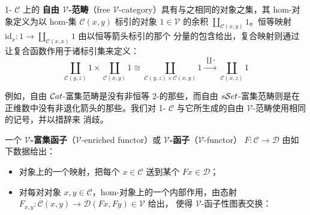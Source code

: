 \begin{definition}\label{def:free-v-category}
1-\trCategory{} $\mathcal{C}$ 上的 \textbf{自由 $\mathcal{V}$-范畴}（free
$\mathcal{V}$-category）具有与之相同的对象之集，其 hom-对象定义为以 hom-集
$\mathcal{C}(x,y)$ 标引的\trTerminal{}对象 $1\in\mathcal{V}$ 的余积
$\coprod_{\mathcal{C}(x,y)}1$。恒等映射
$\mathrm{id}_{x}\colon 1\to\coprod_{\mathcal{C}(x,x)}1$ 由以恒等箭头标引的那个
分量的包含给出，复合映射则通过让复合函数作用于诸标引集来定义：
\[ \coprod_{\mathcal{C}(y,z)}1\times\coprod_{\mathcal{C}(x,y)}1
   \cong\coprod_{\mathcal{C}(y,z)\times\mathcal{C}(x,y)}1
   \xrightarrow{\ \coprod\circ\ }\coprod_{\mathcal{C}(x,z)}1 \]
\end{definition}

例如，自由 $\mathcal{C}at$-富集范畴是没有非恒等 2-\trCell{}的那些，而自由
$s\mathcal{S}et$-富集范畴则是在正维数中没有非退化箭头的那些。我们对 1-\trCategory{}
$\mathcal{C}$ 与它所生成的自由 $\mathcal{V}$-范畴使用相同的记号，并以措辞来
消歧。

\begin{definition}\label{def:v-enriched-functor}
一个 \textbf{$\mathcal{V}$-富集函子}（$\mathcal{V}$-enriched functor）或
\textbf{$\mathcal{V}$-函子}（$\mathcal{V}$-functor）
$F\colon\mathcal{C}\to\mathcal{D}$ 由如下数据给出：
\begin{itemize}
\item 对象上的一个映射，把每个 $x\in\mathcal{C}$ 送到某个 $Fx\in\mathcal{D}$；
\item 对每对对象 $x,y\in\mathcal{C}$，hom-对象上的一个内部作用，由态射
  $F_{x,y}\colon\mathcal{C}(x,y)\to\mathcal{D}(Fx,Fy)\in\mathcal{V}$ 给出，
  使得 $\mathcal{V}$-函子性图表交换：
\end{itemize}
\begin{center}
\qquad
{}
\end{center}
\end{definition}


